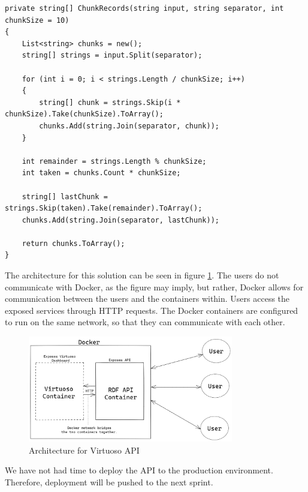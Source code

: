 \begin{lstlisting}[language=CSharp, caption={Chunking logic for large queries}, label={lst:virtuoso_chunking}]
private string[] ChunkRecords(string input, string separator, int chunkSize = 10)
{
    List<string> chunks = new();
    string[] strings = input.Split(separator);
    
    for (int i = 0; i < strings.Length / chunkSize; i++)
    {
        string[] chunk = strings.Skip(i * chunkSize).Take(chunkSize).ToArray();
        chunks.Add(string.Join(separator, chunk));
    }

    int remainder = strings.Length % chunkSize;
    int taken = chunks.Count * chunkSize;

    string[] lastChunk = strings.Skip(taken).Take(remainder).ToArray();
    chunks.Add(string.Join(separator, lastChunk));
    
    return chunks.ToArray();
}
\end{lstlisting}


The architecture for this solution can be seen in figure \ref{fig:virtuoso_architecture}. The users do not communicate with Docker, as the figure may imply, but rather, Docker allows for communication between the users and the containers within. Users access the exposed services through HTTP requests. The Docker containers are configured to run on the same network, so that they can communicate with each other.

\begin{figure}[h!]
\centering
\includegraphics[width=0.8\textwidth]{Images/Virtuoso_Architecture.png}
\caption{Architecture for Virtuoso API}
\label{fig:virtuoso_architecture}
\end{figure}

We have not had time to deploy the API to the production environment. Therefore, deployment will be pushed to the next sprint.